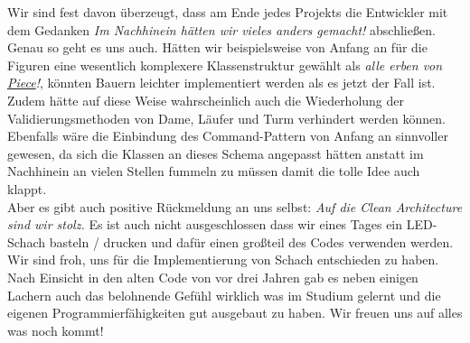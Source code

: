 \documentclass[
10pt, %
a4paper, %
oneside, %
headinclude,footinclude, %
BCOR5mm, %
]{scrartcl}
\begin{document}
\begin{onehalfspace}
Wir sind fest davon überzeugt, dass am Ende jedes Projekts die Entwickler mit dem Gedanken \textit{Im Nachhinein hätten wir vieles anders gemacht!} abschließen. Genau so geht es uns auch. Hätten wir beispielsweise von Anfang an für die Figuren eine wesentlich komplexere Klassenstruktur gewählt als \textit{alle erben von \href{https://github.com/schmida736/Chess-AdvancedSE/blob/main/Chess-AdvancedSE/Game\%20Elements/Pieces/Piece.cs}{Piece}!}, könnten Bauern leichter implementiert werden als es jetzt der Fall ist. Zudem hätte auf diese Weise wahrscheinlich auch die Wiederholung der Validierungsmethoden von Dame, Läufer und Turm verhindert werden können. \\
Ebenfalls wäre die Einbindung des Command-Pattern von Anfang an sinnvoller gewesen, da sich die Klassen an dieses Schema angepasst hätten anstatt im Nachhinein an vielen Stellen fummeln zu müssen damit die tolle Idee auch klappt. \\
Aber es gibt auch positive Rückmeldung an uns selbst: \textit{Auf die Clean Architecture sind wir stolz.} Es ist auch nicht ausgeschlossen dass wir eines Tages ein LED-Schach basteln / drucken und dafür einen großteil des Codes verwenden werden.\\
Wir sind froh, uns für die Implementierung von Schach entschieden zu haben. Nach Einsicht in den alten Code von vor drei Jahren gab es neben einigen Lachern auch das belohnende Gefühl wirklich was im Studium gelernt und die eigenen Programmierfähigkeiten gut ausgebaut zu haben. Wir freuen uns auf alles was noch kommt!


\end{onehalfspace}
\end{document}
